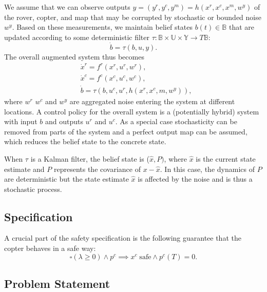 \documentclass[conference]{IEEEtran}
\begin{document}
We assume that we can observe outputs $y = (y^r, y^c, y^m) = h(x^r, x^c, x^m, w^y)$ of the rover, copter, and map that may be corrupted by stochastic or bounded noise $w^y$. Based on these measurements, we maintain belief states $b(t) \in \mathbb{B}$ that are updated according to some deterministic filter $\tau : \mathbb{B} \times \mathbb{U} \times \mathbb{Y} \rightarrow T \mathbb{B}$:
\begin{equation}
  \dot b = \tau(b, u, y).
\end{equation} 
The overall augmented system thus becomes
\begin{equation}
\label{eq:belief}
\begin{aligned}
  & \dot x^r = f^r(x^r, u^r, w^r), \\
  & \dot x^c = f^c(x^c, u^c, w^c), \\
  & \dot b = \tau(b, u^c, u^r, h(x^r, x^c, m, w^y)),
\end{aligned}
\end{equation}
where $w^r$ $w^c$ and $w^y$ are aggregated noise entering the system at different locations. A control policy for the overall system is a (potentially hybrid) system with input $b$ and outputs $u^r$ and $u^c$. As a special case stochasticity can be removed from parts of the system and a perfect output map can be assumed, which reduces the belief state to the concrete state. 

When $\tau$ is a Kalman filter, the belief state is ($\hat x, P)$, where $\hat x$ is the current state estimate and $P$ represents the covariance of $x - \hat x$. In this case, the dynamics of $P$ are deterministic but the state estimate $\hat x$ is affected by the noise and is thus a stochastic process.


\subsection{Specification}

A crucial part of the safety specification is the following guarantee that the copter behaves in a safe way:
\begin{equation}
  \square (\lambda \geq 0) \land p^c \implies x^c \; \text{safe} \land p^c(T) = 0.
\end{equation}


\subsection{Problem Statement}
\end{document}
